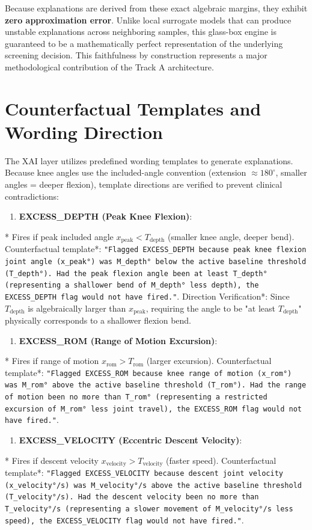 Because explanations are derived from these exact algebraic margins, they exhibit \textbf{zero approximation error}. Unlike local surrogate models that can produce unstable explanations across neighboring samples, this glass-box engine is guaranteed to be a mathematically perfect representation of the underlying screening decision. This faithfulness by construction represents a major methodological contribution of the Track A architecture.



\section{Counterfactual Templates and Wording Direction}
\label{sec:12-4-counterfactual-templates-and-wording-direction}


The XAI layer utilizes predefined wording templates to generate explanations. Because knee angles use the included-angle convention (extension $\approx 180^\circ$, smaller angles = deeper flexion), template directions are verified to prevent clinical contradictions:

\begin{enumerate}
  \item \textbf{EXCESS\_DEPTH (Peak Knee Flexion)}:
\end{enumerate}
*   Fires if peak included angle $x_{\text{peak}} < T_{\text{depth}}$ (smaller knee angle, deeper bend).
\textit{   }Counterfactual template*: \texttt{"Flagged EXCESS\_DEPTH because peak knee flexion joint angle (x\_peak°) was M\_depth° below the active baseline threshold (T\_depth°). Had the peak flexion angle been at least T\_depth° (representing a shallower bend of M\_depth° less depth), the EXCESS\_DEPTH flag would not have fired."}.
\textit{   }Direction Verification*: Since $T_{\text{depth}}$ is algebraically larger than $x_{\text{peak}}$, requiring the angle to be "at least $T_{\text{depth}}$" physically corresponds to a shallower flexion bend.
\begin{enumerate}
  \item \textbf{EXCESS\_ROM (Range of Motion Excursion)}:
\end{enumerate}
*   Fires if range of motion $x_{\text{rom}} > T_{\text{rom}}$ (larger excursion).
\textit{   }Counterfactual template*: \texttt{"Flagged EXCESS\_ROM because knee range of motion (x\_rom°) was M\_rom° above the active baseline threshold (T\_rom°). Had the range of motion been no more than T\_rom° (representing a restricted excursion of M\_rom° less joint travel), the EXCESS\_ROM flag would not have fired."}.
\begin{enumerate}
  \item \textbf{EXCESS\_VELOCITY (Eccentric Descent Velocity)}:
\end{enumerate}
*   Fires if descent velocity $x_{\text{velocity}} > T_{\text{velocity}}$ (faster speed).
\textit{   }Counterfactual template*: \texttt{"Flagged EXCESS\_VELOCITY because descent joint velocity (x\_velocity°/s) was M\_velocity°/s above the active baseline threshold (T\_velocity°/s). Had the descent velocity been no more than T\_velocity°/s (representing a slower movement of M\_velocity°/s less speed), the EXCESS\_VELOCITY flag would not have fired."}.

